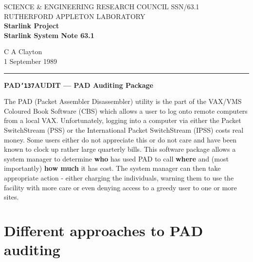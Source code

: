 \pagestyle{myheadings}
\setlength{\textwidth}{160mm}
\setlength{\textheight}{240mm}
\setlength{\topmargin}{-5mm}
\setlength{\oddsidemargin}{0mm}
\setlength{\evensidemargin}{0mm}
\setlength{\parindent}{0mm}
\setlength{\parskip}{\medskipamount}
\setlength{\unitlength}{1mm}

\renewcommand{\_}{{\tt\char'137}}     %

\thispagestyle{empty}
SCIENCE \& ENGINEERING RESEARCH COUNCIL \hfill SSN/63.1\\
RUTHERFORD APPLETON LABORATORY\\
{\large\bf Starlink Project\\}
{\large\bf Starlink System Note 63.1}
\begin{flushright}
C A Clayton\\
1 September 1989
\end{flushright}
\vspace{-4mm}
\rule{\textwidth}{0.5mm}
\vspace{5mm}
\begin{center}
{\Large\bf PAD\_AUDIT --- PAD Auditing Package}
\end{center}
\vspace{5mm}

The PAD (Packet Assembler Disassembler) utility is the part of the VAX/VMS
Coloured Book Software (CBS) which allows a user to log onto remote
computers from a local VAX. Unfortunately, logging into a computer via
either the  Packet SwitchStream (PSS) or the International Packet
SwitchStream (IPSS) costs real money. Some users either do not appreciate
this or do not care and have been known to clock up rather large quarterly
bills. This software package allows a system manager to determine {\bf who} has
used PAD to call {\bf where} and (most importantly) {\bf how much} it has cost.
The system manager can then take appropriate action - either charging the 
individuals, warning them to use the facility with more care or even denying
access to a greedy user to one or more sites. 

\section {Different approaches to PAD auditing}

